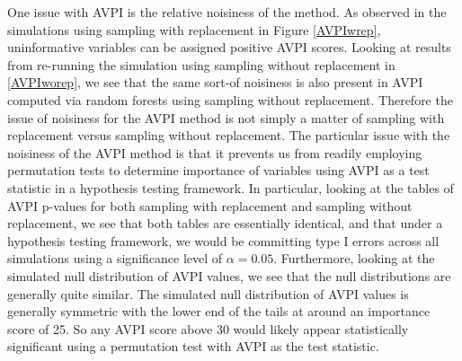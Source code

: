 \documentclass[12pt,twoside]{reedthesis}
\theoremstyle{definition}
\theoremstyle{definition}
\theoremstyle{definition}
\theoremstyle{remark}
\begin{document}
One issue with AVPI is the relative noisiness of the method. As observed
in the simulations using sampling with replacement in Figure
\ref{AVPIwrep}, uninformative variables can be assigned positive AVPI
scores. Looking at results from re-running the simulation using sampling
without replacement in \ref{AVPIworep}, we see that the same sort-of
noisiness is also present in AVPI computed via random forests using
sampling without replacement. Therefore the issue of noisiness for the
AVPI method is not simply a matter of sampling with replacement versus
sampling without replacement. The particular issue with the noisiness of
the AVPI method is that it prevents us from readily employing
permutation tests to determine importance of variables using AVPI as a
test statistic in a hypothesis testing framework. In particular, looking
at the tables of AVPI p-values for both sampling with replacement and
sampling without replacement, we see that both tables are essentially
identical, and that under a hypothesis testing framework, we would be
committing type I errors across all simulations using a significance
level of \(\alpha = 0.05\). Furthermore, looking at the simulated null
distribution of AVPI values, we see that the null distributions are
generally quite similar. The simulated null distribution of AVPI values
is generally symmetric with the lower end of the tails at around an
importance score of 25. So any AVPI score above 30 would likely appear
statistically significant using a permutation test with AVPI as the test
statistic. \par
\end{document}
